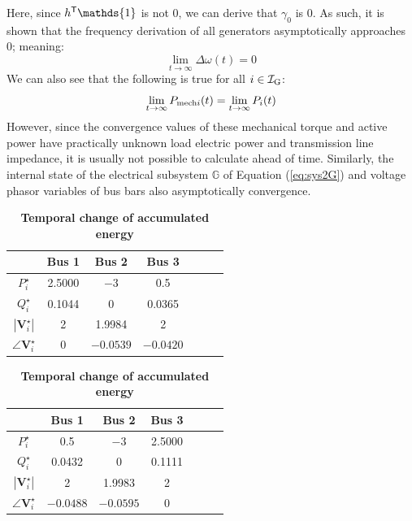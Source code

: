 \documentclass[tombow,dvipdfmx]{corona-a5-1.1}
\begin{document}
Here, since $h^{\sf T} \mathds{1}$ is not 0, we can derive that $\gamma_0$ is 0.
As such, it is shown that the frequency derivation of all generators asymptotically approaches 0; meaning:
\[
\lim_{t\rightarrow \infty}
\Delta \omega (t) = 0
\]
We can also see that the following is true for all $i\in \mathcal{I}_{\rm G}$:
\[
\lim_{t\rightarrow \infty}
P_{{\rm mech}i}(t) 
=
\lim_{t\rightarrow \infty} P_i (t)
\]
However, since the convergence values of these mechanical torque and active power have practically unknown load electric power and transmission line impedance, it is usually not possible to calculate ahead of time.
Similarly, the internal state of the electrical subsystem $\mathds{G}$ of Equation (\ref{eq:sys2G}) and voltage phasor variables of bus bars also asymptotically convergence.

\begin{table}[h]
\medskip
\caption{\textbf{Temporal change of accumulated energy}} \label{table:pflownl}
 \centering
  {
  \begin{minipage}{0.49\linewidth}
    \centering
  \begin{tabular}{|c|c|c|c|c|c|c|}
   \hline
 &  Bus 1 & Bus 2 & Bus 3 \\
   \hline 
   $P_i^{\star}$ & 2.5000 & $-3$ & 0.5 \\
   \hline
   $Q_i^{\star}$ & 0.1044 & 0 & 0.0365 \\
   \hline
   $|\bm{V}_i^{\star}|$ & 2 & 1.9984 & 2 \\
   \hline
   $\angle \bm{V}_i^{\star}$ & 0 & $-0.0539$ & $-0.0420$ \\
   \hline
  \end{tabular}
  \end{minipage}
  \begin{minipage}{0.49\linewidth}
    \centering
  \begin{tabular}{|c|c|c|c|c|c|c|}
   \hline
 &  Bus 1 & Bus 2 & Bus 3 \\
   \hline 
   $P_i^{\star}$ & 0.5 & $-3$ & 2.5000 \\
   \hline
   $Q_i^{\star}$ & 0.0432 & 0 & 0.1111 \\
   \hline
   $|\bm{V}_i^{\star}|$ & 2 & 1.9983 & 2 \\
   \hline
   $\angle \bm{V}_i^{\star}$ & $-0.0488$ & $-0.0595$ & 0 \\
   \hline
  \end{tabular}
  \end{minipage}
  }
\end{table}
\end{document}
